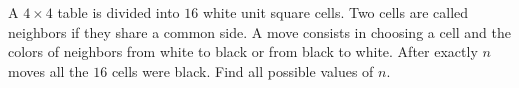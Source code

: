 A $ 4\times 4$ table is divided into $ 16$ white unit square cells. Two cells are called neighbors if they share a common side. A move consists in choosing a cell and the colors of neighbors from white to black or from black to white. After exactly $ n$ moves all the $ 16$ cells were black. Find all possible values of $ n$.